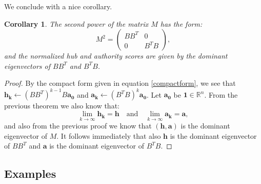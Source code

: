 \documentclass[a4paper,11pt]{report}
\newtheorem{corollary}[theorem]{Corollary}
\newcommand{\R}{{\mathbb R}}
\begin{document}
We conclude with a nice corollary.

\begin{corollary}
The second power of the matrix $M$ has the form:
$$M^2 = \begin{pmatrix} 
BB^T & 0\\
0 & B^TB
\end{pmatrix},$$
and the normalized hub and authority scores are given by the 
dominant eigenvectors of $BB^T$ and $B^TB$.\end{corollary}
 
 \begin{proof}
     By the compact form given in equation \ref{compactform}, we see that $\mathbf{h_k} \leftarrow (BB^T)^{k-1}B\mathbf{a_0}$ 
     and $\mathbf{a_k} \leftarrow (B^TB)^{k}\mathbf{a_0}$. Let $\mathbf{a_0}$ be $\mathbf{1} \in \R^n$. From the previous theorem we 
     also know that:
     $$\lim_{k\to\infty}\mathbf{h_k} = \mathbf{h} \quad \text{and} \quad \lim_{k\to\infty}\mathbf{a_k} = \mathbf{a},$$
     and also from the previous proof we know that $(\mathbf{h}, \mathbf{a})$ is 
     the dominant eigenvector of $M$. It follows immediately that also 
     $\mathbf{h}$ is the dominant eigenvector of $BB^T$ and $\mathbf{a}$ is the dominant eigenvector of 
     $B^TB$.
 \end{proof}
 \subsection{Examples}
\end{document}
